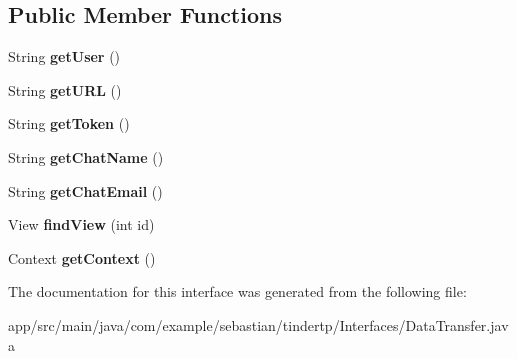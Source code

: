 \subsection*{Public Member Functions}
\begin{DoxyCompactItemize}
\item 
String {\bfseries get\+User} ()\hypertarget{interfacecom_1_1example_1_1sebastian_1_1tindertp_1_1Interfaces_1_1DataTransfer_a738c677709f0691ad6a0c574e354f519}{}\label{interfacecom_1_1example_1_1sebastian_1_1tindertp_1_1Interfaces_1_1DataTransfer_a738c677709f0691ad6a0c574e354f519}

\item 
String {\bfseries get\+U\+RL} ()\hypertarget{interfacecom_1_1example_1_1sebastian_1_1tindertp_1_1Interfaces_1_1DataTransfer_aad9bc59e0427684e4fca1158f387f3d5}{}\label{interfacecom_1_1example_1_1sebastian_1_1tindertp_1_1Interfaces_1_1DataTransfer_aad9bc59e0427684e4fca1158f387f3d5}

\item 
String {\bfseries get\+Token} ()\hypertarget{interfacecom_1_1example_1_1sebastian_1_1tindertp_1_1Interfaces_1_1DataTransfer_adade4c0f005f6ac037813d27fc58591b}{}\label{interfacecom_1_1example_1_1sebastian_1_1tindertp_1_1Interfaces_1_1DataTransfer_adade4c0f005f6ac037813d27fc58591b}

\item 
String {\bfseries get\+Chat\+Name} ()\hypertarget{interfacecom_1_1example_1_1sebastian_1_1tindertp_1_1Interfaces_1_1DataTransfer_a1303ab9e2fdfbbb7b4d12bbbb34cd445}{}\label{interfacecom_1_1example_1_1sebastian_1_1tindertp_1_1Interfaces_1_1DataTransfer_a1303ab9e2fdfbbb7b4d12bbbb34cd445}

\item 
String {\bfseries get\+Chat\+Email} ()\hypertarget{interfacecom_1_1example_1_1sebastian_1_1tindertp_1_1Interfaces_1_1DataTransfer_ac0a87644287125906206186ba72fa8f8}{}\label{interfacecom_1_1example_1_1sebastian_1_1tindertp_1_1Interfaces_1_1DataTransfer_ac0a87644287125906206186ba72fa8f8}

\item 
View {\bfseries find\+View} (int id)\hypertarget{interfacecom_1_1example_1_1sebastian_1_1tindertp_1_1Interfaces_1_1DataTransfer_a876c0d9434ce16f05f6670eb9e0b2068}{}\label{interfacecom_1_1example_1_1sebastian_1_1tindertp_1_1Interfaces_1_1DataTransfer_a876c0d9434ce16f05f6670eb9e0b2068}

\item 
Context {\bfseries get\+Context} ()\hypertarget{interfacecom_1_1example_1_1sebastian_1_1tindertp_1_1Interfaces_1_1DataTransfer_a52a34aca4c220c76a27f7c7813b7322c}{}\label{interfacecom_1_1example_1_1sebastian_1_1tindertp_1_1Interfaces_1_1DataTransfer_a52a34aca4c220c76a27f7c7813b7322c}

\end{DoxyCompactItemize}


The documentation for this interface was generated from the following file\+:\begin{DoxyCompactItemize}
\item 
app/src/main/java/com/example/sebastian/tindertp/\+Interfaces/Data\+Transfer.\+java\end{DoxyCompactItemize}
